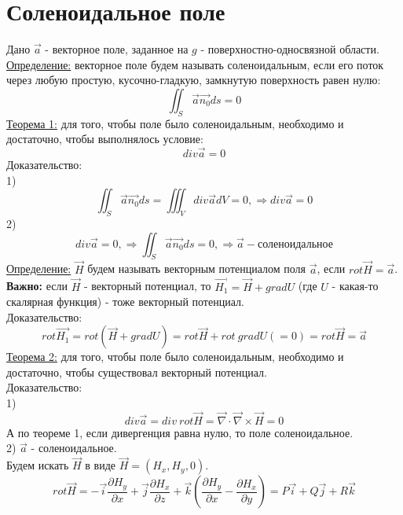 \documentclass[12pt]{article}
\begin{document}
\section{Соленоидальное поле}
Дано $\overrightarrow{a}$ - векторное поле, заданное на $g$ - поверхностно-односвязной области.\\
\uline{Определение:} векторное поле будем называть соленоидальным, если его поток через любую простую, кусочно-гладкую, замкнутую поверхность равен нулю:\\
$$\iint_S \overrightarrow{a} \overrightarrow{n_0} ds = 0$$
\uline{Теорема 1:} для того, чтобы поле было соленоидальным, необходимо и достаточно, чтобы выполнялось условие:\\
$$div \overrightarrow{a} = 0$$
Доказательство:\\
1) $$\iint_S \overrightarrow{a} \overrightarrow{n_0} ds = \iiint_V div \overrightarrow{a} d V = 0, \Rightarrow div \overrightarrow{a} = 0$$
2) $$div \overrightarrow{a} = 0, \Rightarrow \iint_S \overrightarrow{a} \overrightarrow{n_0} ds = 0, \Rightarrow \overrightarrow{a} - \text{соленоидальное}$$
\uline{Определение:} $\overrightarrow{H}$ будем называть векторным потенциалом поля $\overrightarrow{a}$, если $rot \overrightarrow{H} = \overrightarrow{a}$.\\
\textbf{Важно:} если $\overrightarrow{H}$ - векторный потенциал, то $\overrightarrow{H_1} = \overrightarrow{H} + gradU$ (где $U$ - какая-то скалярная функция) - тоже векторный потенциал.\\
Доказательство:\\
$$rot \overrightarrow{H_1} = rot (\overrightarrow{H} + gradU) = rot \overrightarrow{H} + rot \ gradU (=0) = rot \overrightarrow{H} = \overrightarrow{a}$$
\uline{Теорема 2:} для того, чтобы поле было соленоидальным, необходимо и достаточно, чтобы существовал векторный потенциал.\\
Доказательство:\\
1) $$div \overrightarrow{a} = div \ rot \overrightarrow{H} = \overrightarrow{\nabla} \cdot \overrightarrow{\nabla} \times \overrightarrow{H} = 0$$
А по теореме 1, если дивергенция равна нулю, то поле соленоидальное.\\
2) $\overrightarrow{a}$ - соленоидальное.\\
Будем искать $\overrightarrow{H}$ в виде $\overrightarrow{H} = (H_x, H_y, 0)$.\\
$$rot \overrightarrow{H} = -\overrightarrow{i} \frac{\partial H_y}{\partial x} + \overrightarrow{j} \frac{\partial H_x}{\partial z} + \overrightarrow{k} (\frac{\partial H_y}{\partial x} - \frac{\partial H_x}{\partial y}) = P\overrightarrow{i} + Q\overrightarrow{j}+R\overrightarrow{k}$$
\end{document}
